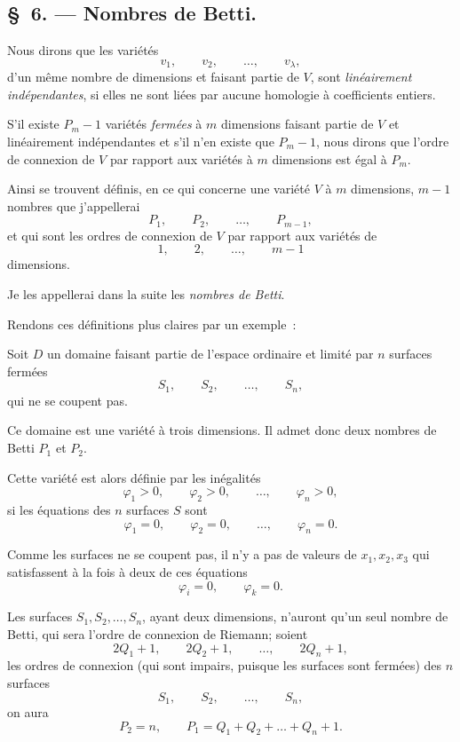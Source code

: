 \documentclass{article}
\begin{document}
\subsection*{\S~6. --- Nombres de Betti.}

Nous dirons que les variétés
\[
v_{1}, \qquad v_{2}, \qquad \ldots, \qquad v_{\lambda},
\]
d'un même nombre de dimensions et faisant partie de $V$, sont \emph{linéairement indépendantes}, si elles ne sont liées par aucune homologie à coefficients entiers.

S'il existe $P_{m} - 1$ variétés \emph{fermées} à $m$ dimensions faisant partie de $V$ et linéairement indépendantes et s'il n'en existe que $P_{m} - 1$, nous dirons que l'ordre de connexion de $V$ par rapport aux variétés à $m$ dimensions est égal à $P_{m}$.

Ainsi se trouvent définis, en ce qui concerne une variété $V$ à $m$ dimensions, $m - 1$ nombres que j'appellerai
\[
P_{1}, \qquad P_{2}, \qquad \ldots, \qquad P_{m-1},
\]
et qui sont les ordres de connexion de $V$ par rapport aux variétés de
\[
1, \qquad 2, \qquad \ldots, \qquad m - 1
\]
dimensions.

Je les appellerai dans la suite les \emph{nombres de Betti}.

Rendons ces définitions plus claires par un exemple~:

Soit $D$ un domaine faisant partie de l'espace ordinaire et limité par $n$ surfaces fermées
\[
S_{1}, \qquad S_{2}, \qquad \ldots, \qquad S_{n},
\]
qui ne se coupent pas.

Ce domaine est une variété à trois dimensions. Il admet donc deux nombres de Betti $P_{1}$ et $P_{2}$.

Cette variété est alors définie par les inégalités
\[
\varphi_{1} > 0, \qquad \varphi_{2} > 0, \qquad \ldots, \qquad \varphi_{n} > 0,
\]
si les équations des $n$ surfaces $S$ sont
\[
\varphi_{1} = 0, \qquad \varphi_{2} = 0, \qquad \ldots, \qquad \varphi_{n} = 0.
\]

Comme les surfaces ne se coupent pas, il n'y a pas de valeurs de $x_{1}, x_{2}, x_{3}$ qui satisfassent à la fois à deux de ces équations
\[
\varphi_{i} = 0, \qquad \varphi_{k} = 0.
\]

Les surfaces $S_{1}, S_{2}, \ldots, S_{n}$, ayant deux dimensions, n'auront qu'un seul nombre de Betti, qui sera l'ordre de connexion de Riemann; soient
\[
2Q_{1} + 1, \qquad 2Q_{2} + 1, \qquad \ldots, \qquad 2Q_{n} + 1,
\]
les ordres de connexion (qui sont impairs, puisque les surfaces sont fermées) des $n$ surfaces
\[
S_{1}, \qquad S_{2}, \qquad \ldots, \qquad S_{n},
\]
on aura
\[
P_{2} = n, \qquad P_{1} = Q_{1} + Q_{2} + \ldots + Q_{n} + 1.
\]
\end{document}
